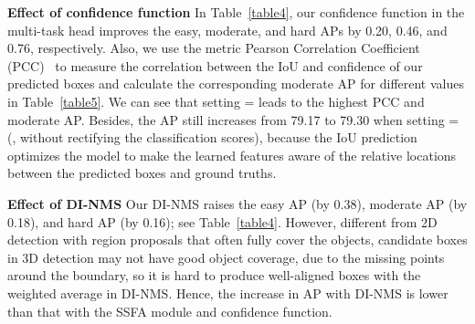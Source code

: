 \documentclass[letterpaper]{article}
\begin{document}
{\bf Effect of confidence function}
In Table~\ref{table4}, our confidence function in the multi-task head improves the easy, moderate, and hard APs by 0.20, 0.46, and 0.76, respectively.
Also, we use the metric Pearson Correlation Coefficient (PCC)~\cite{pearson} to measure the correlation between the IoU and confidence of our predicted boxes and calculate the corresponding moderate AP for different  values in Table~\ref{table5}.
We can see that setting = leads to the highest PCC and moderate AP.
Besides, the AP still increases from 79.17 to 79.30 when setting = (\ie, without rectifying the classification scores), because the IoU prediction optimizes the model to make the learned features aware of the relative locations between the predicted boxes and ground truths.

{\bf Effect of DI-NMS}
Our DI-NMS raises the easy AP (by 0.38), moderate AP (by 0.18), and hard AP (by 0.16); see Table~\ref{table4}.
However, different from 2D detection with region proposals that often fully cover the objects,
candidate boxes in 3D detection may not have good object coverage, due to the missing points around the boundary, so it is hard to produce well-aligned boxes with the weighted average in DI-NMS.
Hence, the increase in AP with DI-NMS is lower than that with the SSFA module and confidence function.




\begin{table}[!th]
    \small
    \begin{center}
    \end{center}
    \vspace*{-2mm}
    \caption{Hyperparameter analysis on  in the confidence function.
    Here, we report the 3D moderate average precision (AP) and Pearson Correlation Coefficient (PCC) between the IoU and confidence of the predicted boxes for different  values in car detection on the KITTI val split.}
    \label{table5}
\end{table}
\end{document}
